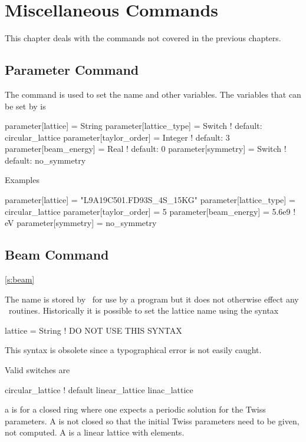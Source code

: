 \chapter{Miscellaneous Commands}

This chapter deals with the commands not covered in the previous chapters.

\section{Parameter Command}

The  command is used to set the  name and other variables. 
The variables that can be set by  is
\begin{example}
  parameter[lattice]      = String 
  parameter[lattice_type] = Switch      ! default: circular_lattice
  parameter[taylor_order] = Integer     ! default: 3
  parameter[beam_energy]  = Real        ! default: 0
  parameter[symmetry]     = Switch      ! default: no_symmetry 
\end{example}

\noindent
Examples
\begin{example}
  parameter[lattice]      = "L9A19C501.FD93S_4S_15KG"
  parameter[lattice_type] = circular_lattice
  parameter[taylor_order] = 5
  parameter[beam_energy]  = 5.6e9    ! eV
  parameter[symmetry]     = no_symmetry
\end{example}

\section{Beam Command}
\ref{s:beam}

The  name is stored by \bmad\ for use by a program but it does
not otherwise effect any \bmad\ routines. 
Historically it is possible to set the lattice name using the syntax
\begin{example}
  lattice = String   ! DO NOT USE THIS SYNTAX
\end{example}
This syntax is obsolete since a typographical error is not easily caught.

\noindent
Valid  switches are
\begin{example}
  circular_lattice  ! default
  linear_lattice
  linac_lattice
\end{example}
a  is for a closed ring where one expects a periodic
solution for the Twiss parameters. A  is not closed
so that the initial Twiss parameters need to be given, not computed. A
 is a linear lattice with  elements.

